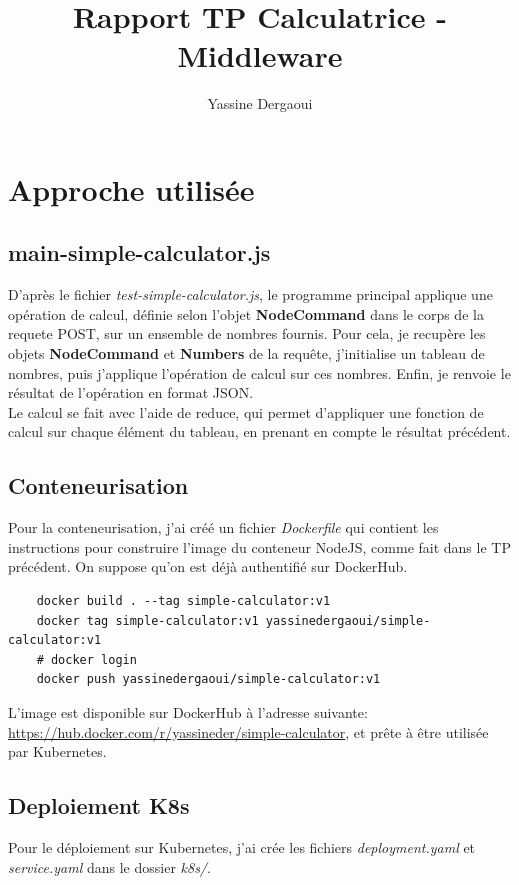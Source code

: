 \documentclass{article}
\title{Rapport TP Calculatrice - Middleware}
\author{Yassine Dergaoui}
\date{}
\begin{document}
\maketitle

\section{Approche utilisée}

\subsection{main-simple-calculator.js}
D'après le fichier \textit{test-simple-calculator.js}, le programme principal applique une opération de calcul, définie selon l'objet \textbf{NodeCommand} 
dans le corps de la requete POST, sur un ensemble de nombres fournis.
Pour cela, je recupère les objets \textbf{NodeCommand} et \textbf{Numbers} de la requête, j'initialise un tableau de nombres, puis j'applique l'opération de calcul sur ces nombres.
Enfin, je renvoie le résultat de l'opération en format JSON. \\
Le calcul se fait avec l'aide de reduce, qui permet d'appliquer une fonction de calcul sur chaque élément du tableau, en prenant en compte le résultat précédent.

\subsection{Conteneurisation}
Pour la conteneurisation, j'ai créé un fichier \textit{Dockerfile} qui contient les instructions pour construire l'image du conteneur NodeJS, comme fait dans le TP précédent.
On suppose qu'on est déjà authentifié sur DockerHub.

\begin{verbatim}
    docker build . --tag simple-calculator:v1
    docker tag simple-calculator:v1 yassinedergaoui/simple-calculator:v1
    # docker login
    docker push yassinedergaoui/simple-calculator:v1
\end{verbatim}

L'image est disponible sur DockerHub à l'adresse suivante: \href{https://hub.docker.com/r/yassineder/simple-calculator}{https://hub.docker.com/r/yassineder/simple-calculator}, et prête à être utilisée par Kubernetes.

\subsection{Deploiement K8s}
Pour le déploiement sur Kubernetes, j'ai crée les fichiers \textit{deployment.yaml} et \textit{service.yaml} dans le dossier \textit{k8s/}.\\
\end{document}
